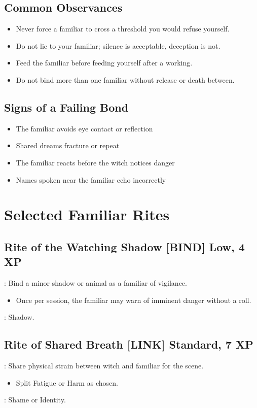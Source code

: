 \subsection{Common Observances}
\begin{itemize}
  \item Never force a familiar to cross a threshold you would refuse yourself.
  \item Do not lie to your familiar; silence is acceptable, deception is not.
  \item Feed the familiar before feeding yourself after a working.
  \item Do not bind more than one familiar without release or death between.
\end{itemize}

\subsection{Signs of a Failing Bond}
\begin{itemize}
  \item The familiar avoids eye contact or reflection
  \item Shared dreams fracture or repeat
  \item The familiar reacts before the witch notices danger
  \item Names spoken near the familiar echo incorrectly
\end{itemize}

\section{Selected Familiar Rites}

\subsection{Rite of the Watching Shadow \hfill \textnormal{[BIND] Low, 4 XP}}
\begin{RiteBox}
: Bind a minor shadow or animal as a familiar of vigilance.
\begin{itemize}
  \item Once per session, the familiar may warn of imminent danger without a roll.
\end{itemize}
: Shadow.
\end{RiteBox}

\subsection{Rite of Shared Breath \hfill \textnormal{[LINK] Standard, 7 XP}}
\begin{RiteBox}
: Share physical strain between witch and familiar for the scene.
\begin{itemize}
  \item Split Fatigue or Harm as chosen.
\end{itemize}
: Shame or Identity.
\end{RiteBox}

